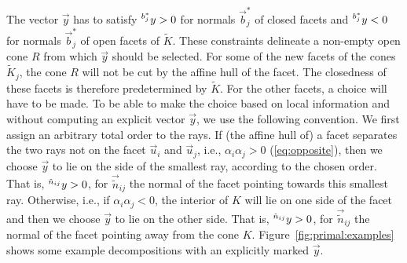 The vector $\vec y$ has to satisfy $\sp{b^*_j}y > 0$ for normals $\vec b^*_j$
of closed facets and $\sp{b^*_j}y < 0$ for normals $\vec b^*_j$ of open facets of
$\tilde K$.
These constraints delineate a non-empty open cone $R$ from which
$\vec y$ should be selected.  For some of the new facets of the cones
$\tilde K_j$, the cone $R$ will not be cut by the affine hull of the facet.
The closedness of these facets is therefore predetermined by $\tilde K$.
For the other facets, a choice will have to be made.
To be able to make the choice based on local information and without
computing an explicit vector $\vec y$, we use the following convention.
We first assign an arbitrary total order to the rays.
If (the affine hull of) a facet separates the two rays not on the facet $\vec u_i$
and $\vec u_j$, i.e., $\alpha_i \alpha_j > 0$ (\ref{eq:opposite}), then
we choose $\vec y$ to lie on the side of the smallest ray, according
to the chosen order.
That is, $\sp{{\tilde n}_{ij}}y > 0$, for
$\vec {\tilde n}_{ij}$ the normal of the facet pointing towards this smallest ray.
Otherwise, i.e., if $\alpha_i \alpha_j < 0$,
the interior of $K$ will lie on one side
of the facet and then we choose $\vec y$ to lie on the other side.
That is, $\sp{{\tilde n}_{ij}}y > 0$, for
$\vec {\tilde n}_{ij}$ the normal of the facet pointing away from the cone $K$.
Figure~\ref{fig:primal:examples} shows some example decompositions with
an explicitly marked $\vec y$.

